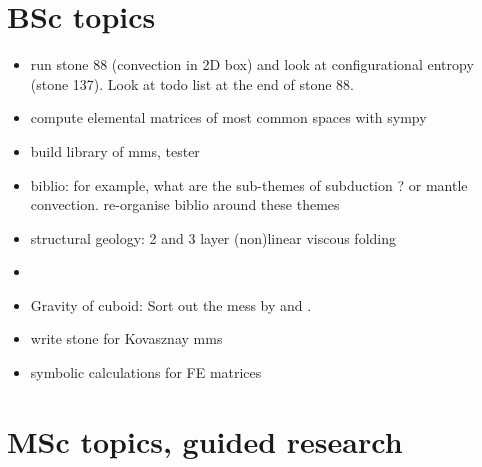 \documentclass[a4paper]{article}
\begin{document}
\newpage
\section{BSc topics}

\begin{itemize}
\item run stone 88 (convection in 2D box) and look at configurational entropy 
(stone 137). Look at todo list at the end of stone 88.
\item compute elemental matrices of most common spaces with sympy
\item build library of mms, tester
\item biblio: for example, what are the sub-themes of subduction ? 
or mantle convection. re-organise biblio around these themes
\item structural geology: 2 and 3 layer (non)linear viscous folding
\item {}
\item Gravity of cuboid: Sort out the mess by \textcite{duti16} and \textcite{zhhu17}.
\item write stone for Kovasznay mms
\item symbolic calculations for FE matrices
\end{itemize}

\newpage
\section{MSc topics, guided research}
\end{document}
